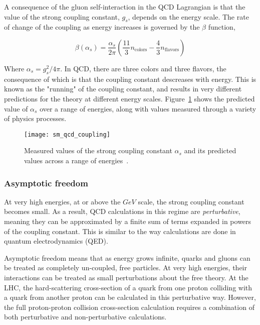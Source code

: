 A consequence of the gluon self-interaction in the QCD Lagrangian is that the value of the strong coupling constant,
$g_s$, depends on the energy scale.
The rate of change of the coupling as energy increases is governed by the $\beta$ function,

\begin{equation}\label{eq:sm-qcd-beta}
    \beta\left(\alpha_s\right) = \frac{\alpha_s}{2\pi}\left(\frac{11}{3}n_{\text{colors}}-\frac{4}{3}n_{\text{flavors}}\right)
\end{equation}

Where $\alpha_s = g_s^2 / 4\pi$.
In QCD, there are three colors and three flavors, the consequence of which is that the coupling constant descreases with energy.
This is known as the "running" of the coupling constant, and results in very different predictions for the theory at different energy scales.
Figure~\ref{fig:sm_qcd_coupling} shows the predicted value of $\alpha_s$ over a range of energies,
along with values measured through a variety of physics processes.

\begin{figure}[!ht]
    \centering
\texttt{[image: sm\_qcd\_coupling]}
\caption{Measured values of the strong coupling constant $\alpha_s$ and its predicted values across a range of energies~\cite{sm-review-2014}.}
\label{fig:sm_qcd_coupling}
\end{figure}

\subsubsection{Asymptotic freedom}

At very high energies, at or above the $GeV$ scale, the strong coupling constant becomes small.
As a result, QCD calculations in this regime are \textit{perturbative},
meaning they can be approximated by a finite sum of terms expanded in powers of the coupling constant.
This is similar to the way calculations are done in quantum electrodynamics (QED).

Asymptotic freedom means that as energy grows infinite,
quarks and gluons can be treated as completely un-coupled, free particles.
At very high energies, their interactions can be treated as small perturbations about the free theory.
At the LHC, the hard-scattering cross-section of a quark from one proton colliding with a quark from another proton
can be calculated in this perturbative way.
However, the full proton-proton collision cross-section calculation requires a combination of both perturbative and non-perturbative calculations.

